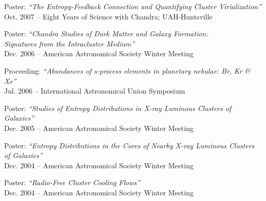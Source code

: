 \documentclass[12pt]{cv}
\begin{document}
\begin{llist}
{\sc Poster: {\textit{``The Entropy-Feedback Connection and Quantifying Cluster Virialization''}}}\\
Oct. 2007 -- Eight Years of Science with Chandra; UAH-Huntsville

{\sc Poster: {\textit{``Chandra Studies of Dark Matter and Galaxy Formation:\\ Signatures from the Intracluster Medium''}}}\\
Dec. 2006 -- American Astronomical Society Winter Meeting

{\sc Proceeding: {\textit{``Abundances of s-process elements in planetary nebulae: Br, Kr \& Xe''}}}\\
Jul. 2006 -- International Astronomical Union Symposium

{\sc Poster: {\textit{``Studies of Entropy Distributions in X-ray Luminous Clusters of Galaxies''}}}\\
Dec. 2005 -- American Astronomical Society Winter Meeting

{\sc Poster: {\textit{``Entropy Distributions in the Cores of Nearby X-ray Luminous Clusters of Galaxies''}}}\\
Dec. 2004 -- American Astronomical Society Winter Meeting

{\sc Poster: {\textit{``Radio-Free Cluster Cooling Flows''}}}\\
Dec. 2004 -- American Astronomical Society Winter Meeting



\end{llist}
\end{document}
